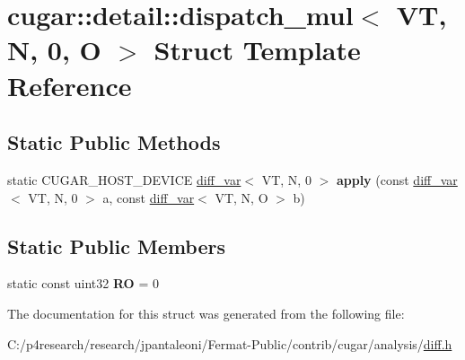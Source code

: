 \hypertarget{structcugar_1_1detail_1_1dispatch__mul_3_01_v_t_00_01_n_00_010_00_01_o_01_4}{}\section{cugar\+:\+:detail\+:\+:dispatch\+\_\+mul$<$ VT, N, 0, O $>$ Struct Template Reference}
\label{structcugar_1_1detail_1_1dispatch__mul_3_01_v_t_00_01_n_00_010_00_01_o_01_4}
\subsection*{Static Public Methods}
\begin{DoxyCompactItemize}
\item 
\mbox{\label{structcugar_1_1detail_1_1dispatch__mul_3_01_v_t_00_01_n_00_010_00_01_o_01_4_a307f39ce0c9d7dc21613291b71a60a8a}} 
static C\+U\+G\+A\+R\+\_\+\+H\+O\+S\+T\+\_\+\+D\+E\+V\+I\+CE \hyperlink{structcugar_1_1diff__var}{diff\+\_\+var}$<$ VT, N, 0 $>$ {\bfseries apply} (const \hyperlink{structcugar_1_1diff__var}{diff\+\_\+var}$<$ VT, N, 0 $>$ a, const \hyperlink{structcugar_1_1diff__var}{diff\+\_\+var}$<$ VT, N, O $>$ b)
\end{DoxyCompactItemize}
\subsection*{Static Public Members}
\begin{DoxyCompactItemize}
\item 
\mbox{\label{structcugar_1_1detail_1_1dispatch__mul_3_01_v_t_00_01_n_00_010_00_01_o_01_4_aa117cd66d41ae883618c9966f5180081}} 
static const uint32 {\bfseries RO} = 0
\end{DoxyCompactItemize}


The documentation for this struct was generated from the following file\+:\begin{DoxyCompactItemize}
\item 
C\+:/p4research/research/jpantaleoni/\+Fermat-\/\+Public/contrib/cugar/analysis/\hyperlink{diff_8h}{diff.\+h}\end{DoxyCompactItemize}
